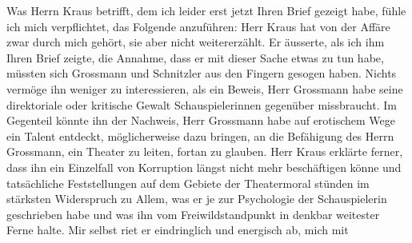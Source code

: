 \pstart
           Was Herrn Kraus betrifft, dem ich leider erst
               jetzt Ihren Brief gezeigt habe, fühle ich mich verpflichtet, das Folgende anzuführen:
               Herr Kraus hat von der Affäre zwar durch mich
               gehört, sie aber nicht weitererzählt. Er äusserte, als ich ihm Ihren Brief zeigte,
               die Annahme, dass er mit dieser Sache etwas zu tun habe, müssten sich Grossmann und Schnitzler aus den Fingern
               gesogen haben. Nichts vermöge ihn weniger zu interessieren, als ein Beweis, Herr Grossmann habe seine direktoriale oder
               kritische Gewalt Schauspielerinnen gegenüber missbraucht. Im Gegenteil könnte ihn der
               Nachweis, Herr Grossmann habe auf erotischem
               Wege ein Talent entdeckt, möglicherweise dazu bringen, an die Befähigung des Herrn
                  Grossmann, ein Theater zu leiten, fortan zu
               glauben. Herr Kraus erklärte ferner, dass ihn
               ein Einzelfall von Korruption längst nicht mehr beschäftigen könne und tatsäch{\pb}liche Feststellungen auf dem Gebiete der Theatermoral
               stünden im stärksten Widerspruch zu Allem, was er je zur Psychologie der
               Schauspielerin geschrieben habe und was ihn vom Freiwildstandpunkt in denkbar
               weitester Ferne halte. Mir selbst riet er eindringlich und energisch ab, mich mit
